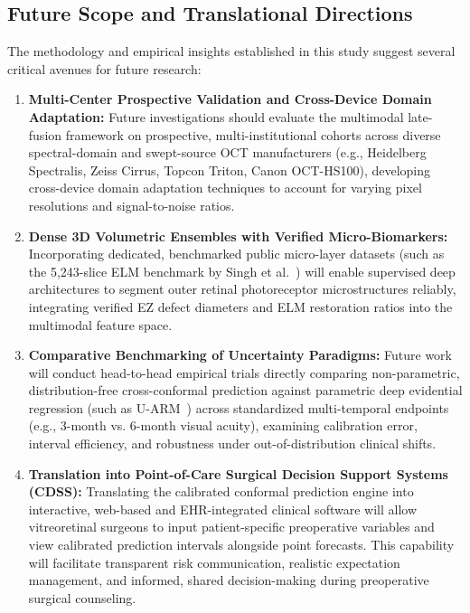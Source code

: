 \documentclass[preprint,12pt]{elsarticle}
\begin{document}
\subsection{Future Scope and Translational Directions}
The methodology and empirical insights established in this study suggest several critical avenues for future research:
\begin{enumerate}
    \item \textbf{Multi-Center Prospective Validation and Cross-Device Domain Adaptation:} Future investigations should evaluate the multimodal late-fusion framework on prospective, multi-institutional cohorts across diverse spectral-domain and swept-source OCT manufacturers (e.g., Heidelberg Spectralis, Zeiss Cirrus, Topcon Triton, Canon OCT-HS100), developing cross-device domain adaptation techniques to account for varying pixel resolutions and signal-to-noise ratios.
    \item \textbf{Dense 3D Volumetric Ensembles with Verified Micro-Biomarkers:} Incorporating dedicated, benchmarked public micro-layer datasets (such as the 5,243-slice ELM benchmark by Singh et al.~\cite{singh2022}) will enable supervised deep architectures to segment outer retinal photoreceptor microstructures reliably, integrating verified EZ defect diameters and ELM restoration ratios into the multimodal feature space.
    \item \textbf{Comparative Benchmarking of Uncertainty Paradigms:} Future work will conduct head-to-head empirical trials directly comparing non-parametric, distribution-free cross-conformal prediction against parametric deep evidential regression (such as U-ARM~\cite{kucukgoz2025}) across standardized multi-temporal endpoints (e.g., 3-month vs. 6-month visual acuity), examining calibration error, interval efficiency, and robustness under out-of-distribution clinical shifts.
    \item \textbf{Translation into Point-of-Care Surgical Decision Support Systems (CDSS):} Translating the calibrated conformal prediction engine into interactive, web-based and EHR-integrated clinical software will allow vitreoretinal surgeons to input patient-specific preoperative variables and view calibrated prediction intervals alongside point forecasts. This capability will facilitate transparent risk communication, realistic expectation management, and informed, shared decision-making during preoperative surgical counseling.
\end{enumerate}

\end{document}
